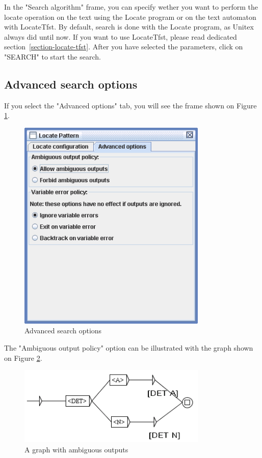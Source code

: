 \bigskip
\noindent
In the "Search algorithm" frame, you can specify wether you want to perform the locate 
operation on the text using the Locate program or on the text automaton with LocateTfst.
By default, search is done with the Locate program, as Unitex always did until now. If you
want to use LocateTfst, please read dedicated section~\ref{section-locate-tfst}.
\bigskip
\noindent
After you have selected the parameters, click on "SEARCH" to start the search.

\clearpage
\subsection{Advanced search options}
\label{section-advanced-search-options}
If you select the "Advanced options" tab, you will see the frame shown on
Figure \ref{fig6-advanced-options1}.

\bigskip
\begin{figure}[!h]
\begin{center}
\includegraphics[width=9cm]{resources/img/fig6-advanced-options1.png}
\caption{Advanced search options\label{fig6-advanced-options1}}
\end{center}
\end{figure}

\noindent The "Ambiguous output policy" option can be illustrated with the
graph shown on Figure \ref{fig6-advanced-options2}.

\begin{figure}[!h]
\begin{center}
\includegraphics[width=9cm]{resources/img/fig6-advanced-options2.png}
\caption{A graph with ambiguous outputs\label{fig6-advanced-options2}}
\end{center}
\end{figure}

